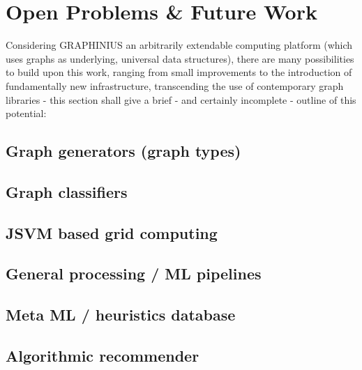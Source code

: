 \chapter{Open Problems \& Future Work}
\label{ch:future_work}


Considering GRAPHINIUS an arbitrarily extendable computing platform (which uses graphs as underlying, universal data structures), there are many possibilities to build upon this work, ranging from small improvements to the introduction of fundamentally new infrastructure, transcending the use of contemporary graph libraries - this section shall give a brief - and certainly incomplete - outline of this potential:


\section{Graph generators (graph types)}
\label{sect:graph_gen}


\section{Graph classifiers}
\label{sect:graph_class}


\section{JSVM based grid computing}
\label{sect:jsvm_grid}


\section{General processing / ML pipelines}
\label{sect:pipelines}


\section{Meta ML / heuristics database}
\label{sect:heuristics}


\section{Algorithmic recommender}
\label{sect:algo_recommender}
